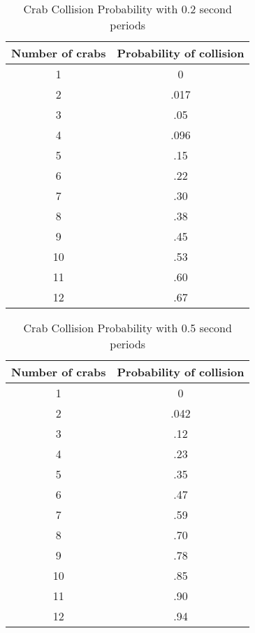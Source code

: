 \documentclass{article}
\begin{document}
\begin{table}[ht]
\centering
\caption{Crab Collision Probability with 0.2 second periods}
\begin{tabular}{|c|c|}
\hline
Number of crabs & Probability of collision \\ \hline
1               & 0                        \\ \hline
2               & .017                     \\ \hline
3               & .05                      \\ \hline
4               & .096                      \\ \hline
5               & .15                      \\ \hline
6               & .22                      \\ \hline
7               & .30                      \\ \hline
8               & .38                      \\ \hline
9               & .45                      \\ \hline
10              & .53                      \\ \hline
11              & .60                      \\ \hline
12              & .67                        \\ \hline
\end{tabular}
\end{table}
\begin{table}[ht]
\centering
\caption{Crab Collision Probability with 0.5 second periods}
\begin{tabular}{|c|c|}
\hline
Number of crabs & Probability of collision \\ \hline
1               & 0                        \\ \hline
2               & .042                     \\ \hline
3               & .12                      \\ \hline
4               & .23                      \\ \hline
5               & .35                      \\ \hline
6               & .47                      \\ \hline
7               & .59                      \\ \hline
8               & .70                      \\ \hline
9               & .78                      \\ \hline
10              & .85                      \\ \hline
11              & .90                      \\ \hline
12              & .94                        \\ \hline
\end{tabular}
\end{table}
\end{document}
